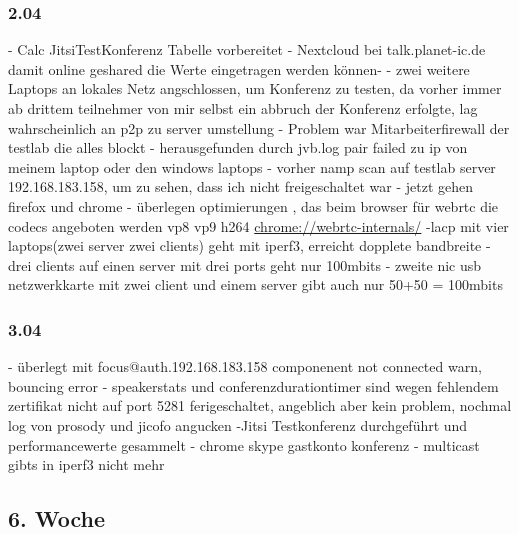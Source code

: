 \documentclass[english,runningheads,a4paper]{llncs}[2018/03/10]
\begin{document}
\subsubsection{2.04}
- Calc JitsiTestKonferenz Tabelle vorbereitet
- Nextcloud bei talk.planet-ic.de damit online geshared die Werte eingetragen werden können-
- zwei weitere Laptops an lokales Netz angschlossen, um Konferenz zu testen, da vorher immer ab drittem teilnehmer von mir selbst ein abbruch der Konferenz erfolgte, lag wahrscheinlich an p2p zu server umstellung
- Problem war Mitarbeiterfirewall der testlab die alles blockt
- herausgefunden durch jvb.log pair failed zu ip von meinem laptop oder den windows laptops
- vorher namp scan auf testlab server 192.168.183.158, um zu sehen, dass ich nicht freigeschaltet war
- jetzt gehen firefox und chrome
- überlegen optimierungen , das beim browser für webrtc die codecs angeboten werden vp8 vp9 h264 \url{chrome://webrtc-internals/}
-lacp mit vier laptops(zwei server zwei clients) geht mit iperf3, erreicht dopplete bandbreite
- drei clients auf einen server mit drei ports geht nur 100mbits
- zweite nic usb netzwerkkarte mit zwei client und einem server gibt auch nur 50+50 = 100mbits

\subsubsection{3.04}
- überlegt mit focus@auth.192.168.183.158 componenent not connected warn, bouncing error
- speakerstats und conferenzdurationtimer sind wegen fehlendem zertifikat nicht auf port 5281 ferigeschaltet, angeblich aber kein problem, nochmal log von prosody und jicofo angucken
-Jitsi Testkonferenz durchgeführt und performancewerte gesammelt
- chrome skype gastkonto konferenz
- multicast gibts in iperf3 nicht mehr

\subsection{6. Woche}
\end{document}
